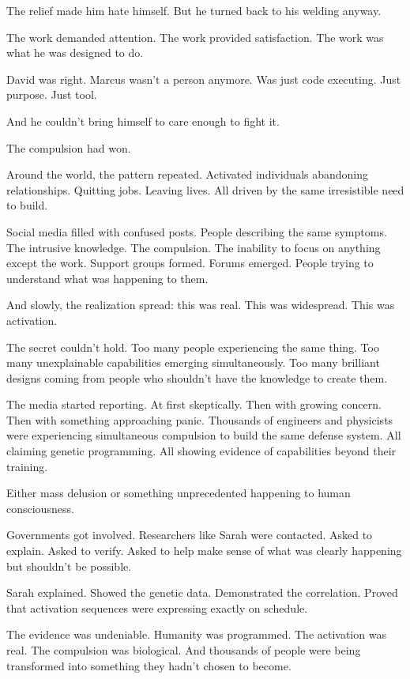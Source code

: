 The relief made him hate himself. But he turned back to his welding anyway.

The work demanded attention. The work provided satisfaction. The work was what he was designed to do.

David was right. Marcus wasn't a person anymore. Was just code executing. Just purpose. Just tool.

And he couldn't bring himself to care enough to fight it.

The compulsion had won.

\scenebreak

Around the world, the pattern repeated. Activated individuals abandoning relationships. Quitting jobs. Leaving lives. All driven by the same irresistible need to build.

Social media filled with confused posts. People describing the same symptoms. The intrusive knowledge. The compulsion. The inability to focus on anything except the work. Support groups formed. Forums emerged. People trying to understand what was happening to them.

And slowly, the realization spread: this was real. This was widespread. This was activation.

The secret couldn't hold. Too many people experiencing the same thing. Too many unexplainable capabilities emerging simultaneously. Too many brilliant designs coming from people who shouldn't have the knowledge to create them.

The media started reporting. At first skeptically. Then with growing concern. Then with something approaching panic. Thousands of engineers and physicists were experiencing simultaneous compulsion to build the same defense system. All claiming genetic programming. All showing evidence of capabilities beyond their training.

Either mass delusion or something unprecedented happening to human consciousness.

Governments got involved. Researchers like Sarah were contacted. Asked to explain. Asked to verify. Asked to help make sense of what was clearly happening but shouldn't be possible.

Sarah explained. Showed the genetic data. Demonstrated the correlation. Proved that activation sequences were expressing exactly on schedule.

The evidence was undeniable. Humanity was programmed. The activation was real. The compulsion was biological. And thousands of people were being transformed into something they hadn't chosen to become.

